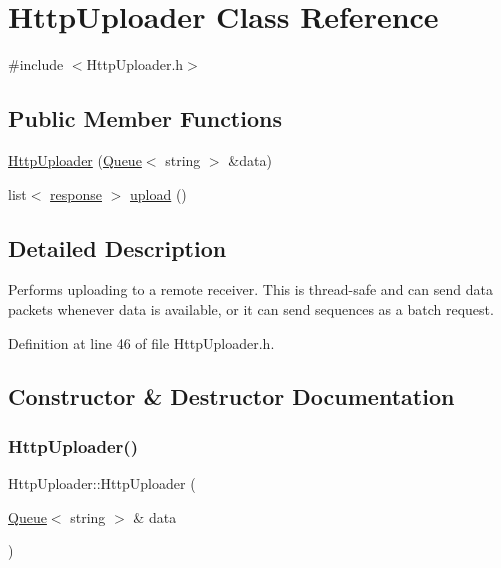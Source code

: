 \hypertarget{classHttpUploader}{}\section{Http\+Uploader Class Reference}
\label{classHttpUploader}


{\ttfamily \#include $<$Http\+Uploader.\+h$>$}

\subsection*{Public Member Functions}
\begin{DoxyCompactItemize}
\item 
\mbox{\hyperlink{classHttpUploader_ae324f02fb96a992a6fc93c1fcf077f78}{Http\+Uploader}} (\mbox{\hyperlink{classQueue}{Queue}}$<$ string $>$ \&data)
\item 
list$<$ \mbox{\hyperlink{structresponse}{response}} $>$ \mbox{\hyperlink{classHttpUploader_ad97b880d70d66d826b832d1273a73ab1}{upload}} ()
\end{DoxyCompactItemize}


\subsection{Detailed Description}
Performs uploading to a remote receiver. This is thread-\/safe and can send data packets whenever data is available, or it can send sequences as a batch request. 

Definition at line 46 of file Http\+Uploader.\+h.



\subsection{Constructor \& Destructor Documentation}
\mbox{\label{classHttpUploader_ae324f02fb96a992a6fc93c1fcf077f78}} 
\subsubsection{\texorpdfstring{HttpUploader()}{HttpUploader()}}
{\footnotesize\ttfamily Http\+Uploader\+::\+Http\+Uploader (\begin{DoxyParamCaption}\item[{\mbox{\hyperlink{classQueue}{Queue}}$<$ string $>$ \&}]{data }\end{DoxyParamCaption})\hspace{0.3cm}{\ttfamily [explicit]}}

